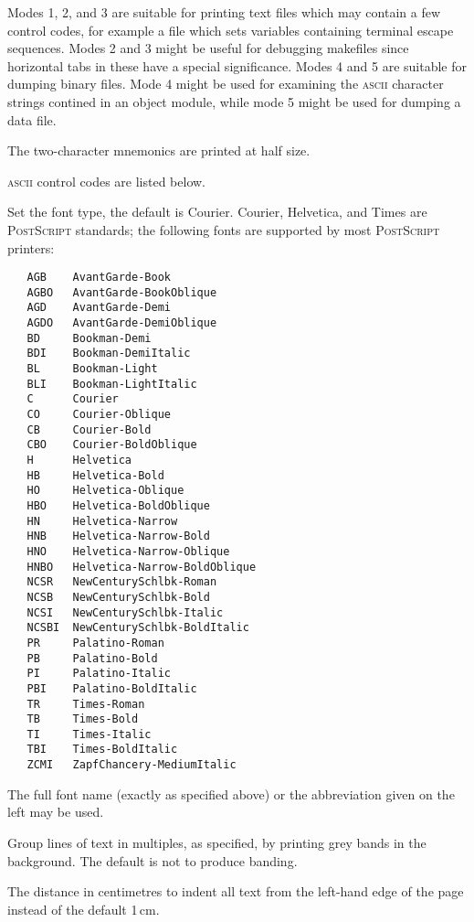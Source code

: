 \begin{description}
   Modes 1, 2, and 3 are suitable for printing text files which may contain a
   few control codes, for example a  file which sets variables
   containing terminal escape sequences.  Modes 2 and 3 might be useful for
   debugging makefiles since horizontal tabs in these have a special
   significance.  Modes 4 and 5 are suitable for dumping binary files.   Mode
   4 might be used for examining the \textsc{ascii} character strings contined
   in an object module, while mode 5 might be used for dumping a data file.

   The two-character mnemonics are printed at half size.

   \textsc{ascii} control codes are listed below.

\item[\exe{-f}\code{font}]
   Set the font type, the default is Courier.  Courier, Helvetica, and Times
   are \textsc{PostScript} standards; the following fonts are supported by
   most \textsc{PostScript} printers:

\begin{verbatim}
   AGB    AvantGarde-Book
   AGBO   AvantGarde-BookOblique
   AGD    AvantGarde-Demi
   AGDO   AvantGarde-DemiOblique
   BD     Bookman-Demi
   BDI    Bookman-DemiItalic
   BL     Bookman-Light
   BLI    Bookman-LightItalic
   C      Courier
   CO     Courier-Oblique
   CB     Courier-Bold
   CBO    Courier-BoldOblique
   H      Helvetica
   HB     Helvetica-Bold
   HO     Helvetica-Oblique
   HBO    Helvetica-BoldOblique
   HN     Helvetica-Narrow
   HNB    Helvetica-Narrow-Bold
   HNO    Helvetica-Narrow-Oblique
   HNBO   Helvetica-Narrow-BoldOblique
   NCSR   NewCenturySchlbk-Roman
   NCSB   NewCenturySchlbk-Bold
   NCSI   NewCenturySchlbk-Italic
   NCSBI  NewCenturySchlbk-BoldItalic
   PR     Palatino-Roman
   PB     Palatino-Bold
   PI     Palatino-Italic
   PBI    Palatino-BoldItalic
   TR     Times-Roman
   TB     Times-Bold
   TI     Times-Italic
   TBI    Times-BoldItalic
   ZCMI   ZapfChancery-MediumItalic
\end{verbatim}

\noindent
   The full font name (exactly as specified above) or the abbreviation given
   on the left may be used.

\item[\exe{-g}\code{\#}]
   Group lines of text in multiples, as specified, by printing grey bands in
   the background.  The default is not to produce banding.

\item[\exe{-i}\code{\#}]
   The distance in centimetres to indent all text from the left-hand edge of
   the page instead of the default 1\,cm.


\end{description}
